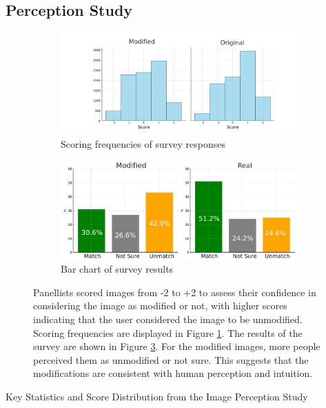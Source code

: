 \begin{spacing}{1.5}
\section{Perception Study}
\begin{figure}[t!]
    \centering
    \begin{subfigure}{.9\textwidth}
        \centering
        \includegraphics[width=0.95\columnwidth]{Chapter5/score.pdf}
        \caption{Scoring frequencies of survey responses}
        \label{fig:survey_hist}
    \end{subfigure}\hfill
    \begin{subfigure}{.9\textwidth}
        \centering
        \includegraphics[width=0.95\columnwidth]{Chapter5/bar_charts_modified.pdf}
        \caption{Bar chart of survey results}
        \label{fig:bar_charts}
    \end{subfigure}
    \caption{Panellists scored images from -2 to +2 to assess their confidence in considering the image as modified or not, with higher scores indicating that the user considered the image to be unmodified. Scoring frequencies are displayed in Figure \ref{fig:survey_hist}. The results of the survey are shown in Figure \ref{fig:bar_charts}. For the modified images, more people perceived them as unmodified or not sure. This suggests that the modifications are consistent with human perception and intuition.}
\end{figure}
\begin{table}[t!]
    \caption{Key Statistics and Score Distribution from the Image Perception Study}

\end{table}
\end{spacing}
